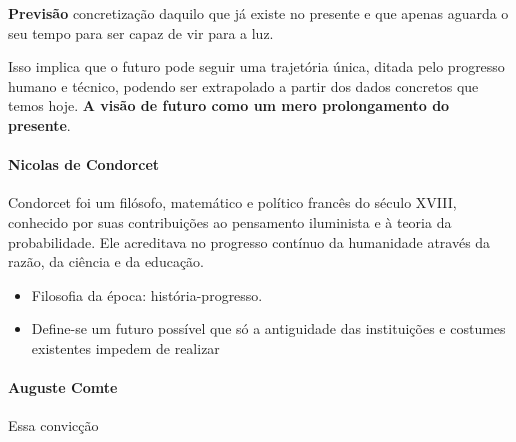 \begin{keypoint}
\textbf{Previsão} concretização daquilo que já existe no presente e que apenas aguarda o seu tempo para ser capaz de vir para a luz.
\end{keypoint}

Isso implica que o futuro pode seguir uma trajetória única, ditada pelo progresso humano e técnico, podendo ser extrapolado a partir dos dados concretos que temos hoje. \textbf{A visão de futuro como um mero prolongamento do presente}.

\paragraph{Nicolas de Condorcet}
Condorcet foi um filósofo, matemático e político francês do século XVIII, conhecido por suas contribuições ao pensamento iluminista e à teoria da probabilidade. Ele acreditava no progresso contínuo da humanidade através da razão, da ciência e da educação.
\begin{itemize}
  \item Filosofia da época: história-progresso.
  \item Define-se um futuro possível que só a antiguidade das instituições e costumes existentes impedem de realizar
\end{itemize}


\paragraph{Auguste Comte}
Essa convicção 




\sectionbreak